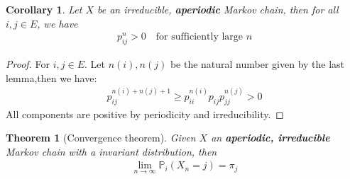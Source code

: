 \documentclass[a4paper,11pt]{book}
\newtheorem{theorem}{Theorem}[section]
\newtheorem{corollary}{Corollary}[theorem]
\theoremstyle{definition}
\theoremstyle{remark}
\begin{document}
\begin{corollary}
	Let $X$ be an irreducible, \textbf{aperiodic }Markov chain, then for all $i, j \in E$, we have
	\begin{align*}
		p_{ij}^n > 0 \quad \text{for sufficiently large $n$}
	\end{align*}
\end{corollary}
\begin{proof}
	For $i, j \in E$. Let $n(i), n(j)$ be the natural number given by the last lemma,then we have:
	\begin{align*}
		p_{ij}^{n(i) + n(j) + 1} \ge p_{ii}^{n(i)} p_{ij} p_{jj}^{n(j)}>0
	\end{align*}
	All components are positive by periodicity and irreducibility.
\end{proof}

\begin{theorem}[Convergence theorem]
	Given $X$ an \textbf{aperiodic, irreducible} Markov chain with a invariant distribution, then
	\begin{align*}
		\lim_{n \rightarrow \infty}\mathbb{P}_i (X_n = j) = \pi_j
	\end{align*}
\end{theorem}
\end{document}
